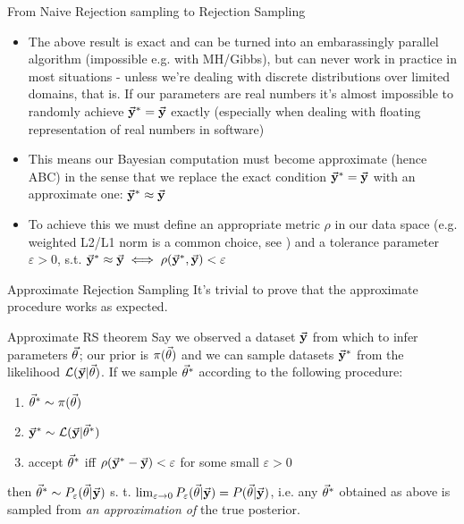 \documentclass{beamer}
\theoremstyle{remark}
\renewcommand{\L}{\mathcal{L}}
\begin{document}
\begin{frame}{From Naive Rejection sampling to Rejection Sampling}
\begin{itemize}[<+->]
    \item The above result is exact and can be turned into an embarassingly parallel algorithm (impossible e.g. with MH/Gibbs), but can never work in practice in most situations - unless we're dealing with discrete distributions over limited domains, that is. If our parameters are real numbers it's almost impossible to randomly achieve $\va{y}^* = \va{y}$ exactly (especially when dealing with floating representation of real numbers in software)
    \item This means our Bayesian computation must become approximate (hence ABC) in the sense that we replace the exact condition $\va{y}^* = \va{y}$ with an approximate one: $\va{y}^* \approx \va{y}$
    \item To achieve this we must define an appropriate metric $\rho$ in our data space (e.g. weighted L2/L1 norm is a common choice, see \cite{astroABC}) and a tolerance parameter $\varepsilon > 0$, s.t. $\va{y}^*\approx\va{y} \iff \rho(\va{y}^*, \va{y}) < \varepsilon$
\end{itemize}

\end{frame}

\begin{frame}{Approximate Rejection Sampling}
It's trivial to prove that the approximate procedure works as expected.
\begin{block}{Approximate RS theorem}
Say we observed a dataset $\va{y}$ from which to infer parameters $\va{\theta}$; our prior is $\pi(\va{\theta})$ and we can sample datasets $\va{y}^*$ from the likelihood $\L(\va{y}|\va{\theta})$. If we sample $\va{\theta}^*$ according to the following procedure:
\begin{enumerate}
    \item $\va{\theta}^*\sim \pi(\va{\theta})$
    \item $\va{y}^*\sim \L(\va{y}|\va{\theta}^*)$
    \item accept $\va{\theta}^*$ iff $\rho(\va{y}^*-\va{y}) < \varepsilon$ for some small $\varepsilon > 0$
\end{enumerate}
then $\va{\theta}^*\sim P_\varepsilon(\va{\theta}|\va{y})$ s. t. $\lim_{\varepsilon\to 0} P_\varepsilon(\va{\theta}|\va{y}) = P(\va{\theta}|\va{y})$, i.e. any $\va{\theta}^*$ obtained as above is sampled from \emph{an approximation of} the true posterior.
\end{block}
    
\end{frame}
\end{document}
